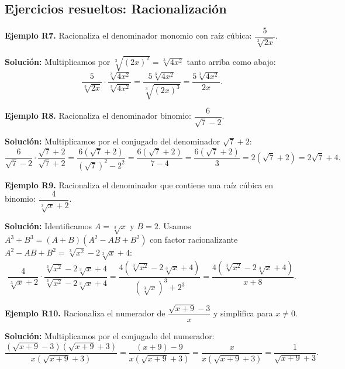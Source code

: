 \documentclass[12pt, letterpaper]{article}
\begin{document}
\subsection{Ejercicios resueltos: Racionalización}

\textbf{Ejemplo R7.} Racionaliza el denominador monomio con raíz cúbica: $\dfrac{5}{\sqrt[3]{2x}}$.

\begin{cuadrosolucion}
      \textbf{Solución:}
      Multiplicamos por $\sqrt[3]{(2x)^2} = \sqrt[3]{4x^2}$ tanto arriba como abajo:
      $$\frac{5}{\sqrt[3]{2x}} \cdot \frac{\sqrt[3]{4x^2}}{\sqrt[3]{4x^2}} = \frac{5\sqrt[3]{4x^2}}{\sqrt[3]{(2x)^3}} = \frac{5\sqrt[3]{4x^2}}{2x}.$$
\end{cuadrosolucion}

\textbf{Ejemplo R8.} Racionaliza el denominador binomio: $\dfrac{6}{\sqrt{7} - 2}$.

\begin{cuadrosolucion}
      \textbf{Solución:}
      Multiplicamos por el conjugado del denominador $\sqrt{7} + 2$:
      $$\frac{6}{\sqrt{7} - 2} \cdot \frac{\sqrt{7} + 2}{\sqrt{7} + 2} = \frac{6(\sqrt{7} + 2)}{(\sqrt{7})^2 - 2^2} = \frac{6(\sqrt{7} + 2)}{7 - 4} = \frac{6(\sqrt{7} + 2)}{3} = 2(\sqrt{7} + 2) = 2\sqrt{7} + 4.$$
\end{cuadrosolucion}

\textbf{Ejemplo R9.} Racionaliza el denominador que contiene una raíz cúbica en binomio: $\dfrac{4}{\sqrt[3]{x} + 2}$.

\begin{cuadrosolucion}
      \textbf{Solución:}
      Identificamos $A = \sqrt[3]{x}$ y $B = 2$. Usamos $A^3 + B^3 = (A + B)(A^2 - AB + B^2)$ con factor racionalizante $A^2 - AB + B^2 = \sqrt[3]{x^2} - 2\sqrt[3]{x} + 4$:
      $$\frac{4}{\sqrt[3]{x} + 2} \cdot \frac{\sqrt[3]{x^2} - 2\sqrt[3]{x} + 4}{\sqrt[3]{x^2} - 2\sqrt[3]{x} + 4} = \frac{4(\sqrt[3]{x^2} - 2\sqrt[3]{x} + 4)}{(\sqrt[3]{x})^3 + 2^3} = \frac{4(\sqrt[3]{x^2} - 2\sqrt[3]{x} + 4)}{x + 8}.$$
\end{cuadrosolucion}

\textbf{Ejemplo R10.} Racionaliza el numerador de $\dfrac{\sqrt{x + 9} - 3}{x}$ y simplifica para $x \neq 0$.

\begin{cuadrosolucion}
      \textbf{Solución:}
      Multiplicamos por el conjugado del numerador:
      $$\frac{(\sqrt{x + 9} - 3)(\sqrt{x + 9} + 3)}{x(\sqrt{x + 9} + 3)} = \frac{(x + 9) - 9}{x(\sqrt{x + 9} + 3)} = \frac{x}{x(\sqrt{x + 9} + 3)} = \frac{1}{\sqrt{x + 9} + 3}.$$
\end{cuadrosolucion}
\end{document}
